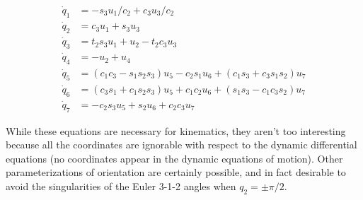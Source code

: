 \documentclass[letterpaper,11pt]{article}
\begin{document}
\begin{align*}
  \dot{q}_1 &=  -s_3u_1/c_2 + c_3u_3/c_2\\
  \dot{q}_2 &=  c_3u_1 + s_3u_3 \\
  \dot{q}_3 &=  t_2s_3u_1 + u_2 - t_2c_3u_3 \\
  \dot{q}_4 &= -u_2 +  u_4 \\
  \dot{q}_5 &= (c_1c_3 - s_1s_2s_3)u_5 - c_2s_1u_6 + (c_1s_3 + c_3s_1s_2)u_7\\
  \dot{q}_6 &= (c_3s_1 + c_1s_2s_3)u_5 + c_1c_2u_6 + (s_1s_3 - c_1c_3s_2)u_7\\
  \dot{q}_7 &= -c_2s_3u_5 + s_2u_6 + c_2c_3u_7
\end{align*}

While these equations are necessary for kinematics, they aren't too interesting
because all the coordinates are ignorable with respect to the dynamic
differential equations (no coordinates appear in the dynamic equations of
motion).  Other parameterizations of orientation are certainly possible, and in
fact desirable to avoid the singularities of the Euler 3-1-2 angles when $q_2 =
\pm \pi/2$.
\end{document}
